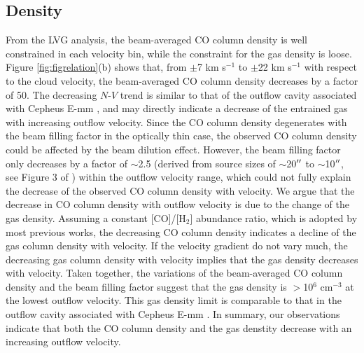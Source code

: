 \subsection{Density}\label{subsec:density}
From the LVG analysis, the beam-averaged CO column density is well constrained in each velocity bin, while the constraint for the gas density is loose. Figure \ref{fig:figrelation}(b) shows that, from $\pm$7 km s$^{-1}$ to $\pm$22 km s$^{-1}$ with respect to the cloud velocity, the beam-averaged CO column density decreases by a factor of 50. The decreasing $N$-$V$ trend is similar to that of the outflow cavity associated with Cepheus E-mm \citep{2015A&A...581A...4L}, and may directly indicate a decrease of the entrained gas with increasing outflow velocity. Since the CO column density degenerates with the beam filling factor in the optically thin case, the observed CO column density could be affected by the beam dilution effect. However, the beam filling factor only decreases by a factor of $\sim$2.5 (derived from source sizes of $\sim$20$\mbox{$^{\prime\prime}$}$ to $\sim$10$\mbox{$^{\prime\prime}$}$, see Figure 3 of \citet{2009ApJ...696...66Q}) within the outflow velocity range, which could not fully explain the decrease of the observed CO column density with velocity. We argue that the decrease in CO column density with outflow velocity is due to the change of the gas density. Assuming a constant [CO]/[H$_2$] abundance ratio, which is adopted by most previous works, the decreasing CO column density indicates a decline of the gas column density with velocity. If the velocity gradient do not vary much, the decreasing gas column density with velocity implies that the gas density decreases with velocity. Taken together, the variations of the beam-averaged CO column density and the beam filling factor suggest that the gas density is $>$10$^6$ cm$^{-3}$ at the lowest outflow velocity. This gas density limit is comparable to that in the outflow cavity associated with Cepheus E-mm \citep[Several times of 10$^5$ cm$^{-3}$:][]{2015A&A...581A...4L}. In summary, our observations indicate that both the CO column density and the gas denstity decrease with an increasing outflow velocity.

